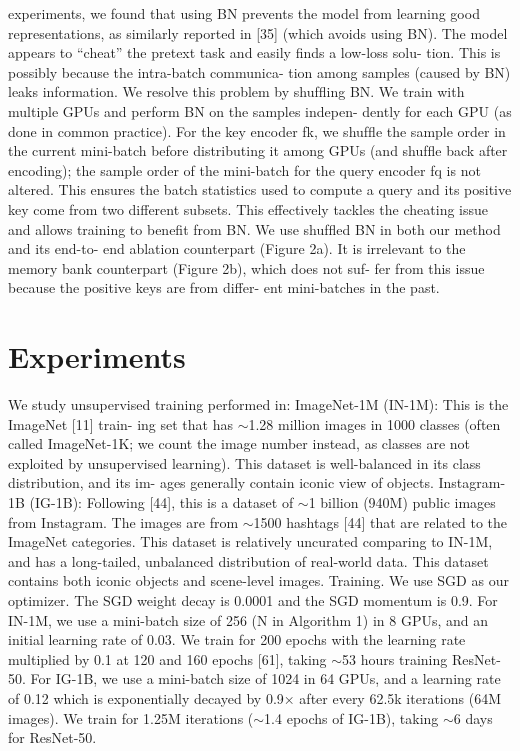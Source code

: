 \documentclass[10pt,twocolumn]{article}  %
\begin{document}
experiments, we found that using BN prevents the model
from learning good representations, as similarly reported
in [35] (which avoids using BN). The model appears to
“cheat” the pretext task and easily ﬁnds a low-loss solu-
tion. This is possibly because the intra-batch communica-
tion among samples (caused by BN) leaks information.
We resolve this problem by shufﬂing BN. We train with
multiple GPUs and perform BN on the samples indepen-
dently for each GPU (as done in common practice). For the
key encoder fk, we shufﬂe the sample order in the current
mini-batch before distributing it among GPUs (and shufﬂe
back after encoding); the sample order of the mini-batch
for the query encoder fq is not altered. This ensures the
batch statistics used to compute a query and its positive key
come from two different subsets. This effectively tackles
the cheating issue and allows training to beneﬁt from BN.
We use shufﬂed BN in both our method and its end-to-
end ablation counterpart (Figure 2a). It is irrelevant to the
memory bank counterpart (Figure 2b), which does not suf-
fer from this issue because the positive keys are from differ-
ent mini-batches in the past.

\section{Experiments}
We study unsupervised training performed in:
ImageNet-1M (IN-1M): This is the ImageNet [11] train-
ing set that has $\sim$1.28 million images in 1000 classes (often
called ImageNet-1K; we count the image number instead,
as classes are not exploited by unsupervised learning). This
dataset is well-balanced in its class distribution, and its im-
ages generally contain iconic view of objects.
Instagram-1B (IG-1B): Following [44], this is a dataset
of $\sim$1 billion (940M) public images from Instagram. The
images are from $\sim$1500 hashtags [44] that are related to the
ImageNet categories. This dataset is relatively uncurated
comparing to IN-1M, and has a long-tailed, unbalanced
distribution of real-world data. This dataset contains both
iconic objects and scene-level images.
Training. We use SGD as our optimizer. The SGD weight
decay is 0.0001 and the SGD momentum is 0.9. For IN-1M,
we use a mini-batch size of 256 (N in Algorithm 1) in 8
GPUs, and an initial learning rate of 0.03. We train for 200
epochs with the learning rate multiplied by 0.1 at 120 and
160 epochs [61], taking $\sim$53 hours training ResNet-50. For
IG-1B, we use a mini-batch size of 1024 in 64 GPUs, and
a learning rate of 0.12 which is exponentially decayed by
0.9× after every 62.5k iterations (64M images). We train
for 1.25M iterations ($\sim$1.4 epochs of IG-1B), taking $\sim$6 days
for ResNet-50.
\end{document}
